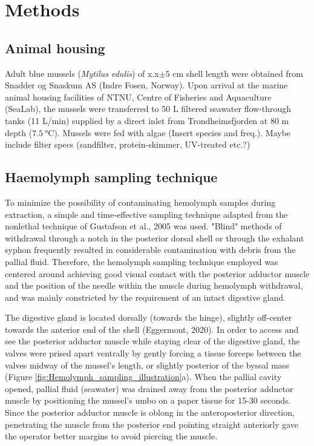 \newpage

\section{Methods}
\subsection{Animal housing}
Adult blue mussels (\emph{Mytilus edulis}) of x.x$\pm{5}$ cm shell length were obtained from Snadder og Snaskum AS (Indre Fosen, Norway). Upon arrival at the marine animal housing facilities of NTNU, Centre of Fisheries and Aquaculture (SeaLab), the mussels were transferred to 50 L filtered seawater flow-through tanks (11 L/min) supplied by a direct inlet from Trondheimsfjorden at 80 m depth ($\SI{7.5}{\celsius}$). Mussels were fed with algae (Insert species and freq.). Maybe include filter specs (sandfilter, protein-skimmer, UV-treated etc.?)

\subsection{Haemolymph sampling technique}
\label{subsection:haemolymph sampling technique}
To minimize the possibility of contaminating hemolymph samples during extraction, a simple and time-effective sampling technique adapted from the nonlethal technique of Gustafson et al., 2005 was used. "Blind" methods of withdrawal through a notch in the posterior dorsal shell or through the exhalant syphon frequently resulted in considerable contamination with debris from the pallial fluid. Therefore, the hemolymph sampling technique employed was centered around achieving good visual contact with the posterior adductor muscle and the position of the needle within the muscle during hemolymph withdrawal, and was mainly constricted by the requirement of an intact digestive gland.

The digestive gland is located dorsally (towards the hinge), slightly off-center towards the anterior end of the shell (Eggermont, 2020). In order to access and see the posterior adductor muscle while staying clear of the digestive gland, the valves were prised apart ventrally by gently forcing a tissue forceps between the valves midway of the mussel's length, or slightly posterior of the byssal mass (Figure \ref{fig:Hemolymph_sampling_illustration}a). When the pallial cavity opened, pallial fluid (seawater) was drained away from the posterior adductor muscle by positioning the mussel's umbo on a paper tissue for 15-30 seconds. Since the posterior adductor muscle is oblong in the anteroposterior direction, penetrating the muscle from the posterior end pointing straight anteriorly gave the operator better margins to avoid piercing the muscle.

